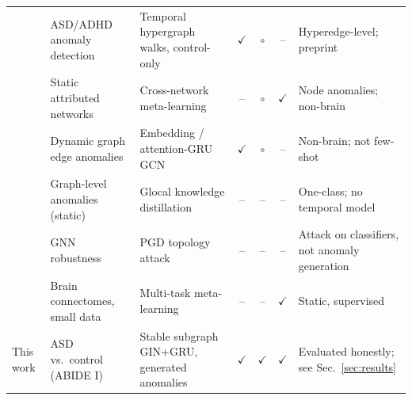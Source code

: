 \documentclass[conference]{IEEEtran}
\newcommand{\ok}{\ensuremath{\checkmark}}
\newcommand{\part}{\ensuremath{\circ}}
\newcommand{\no}{--}
\begin{document}
\begin{table}[!tp]
\begin{tabular}{@{}>{\raggedright\arraybackslash}p{1.0cm}>{\raggedright\arraybackslash}p{3.8cm}>{\raggedright\arraybackslash}p{4.2cm}ccc >{\raggedright\arraybackslash}p{4.2cm}@{}}
\cite{sadeghian2024} & ASD/ADHD anomaly detection & Temporal hypergraph walks, control-only & \ok & \part & \no & Hyperedge-level; preprint \\
\cite{ding2021fewshot} & Static attributed networks & Cross-network meta-learning & \no & \part & \ok & Node anomalies; non-brain \\
\cite{yu2018netwalk,zheng2019addgraph} & Dynamic graph edge anomalies & Embedding / attention-GRU GCN & \ok & \part & \no & Non-brain; not few-shot \\
\cite{ma2022glocal} & Graph-level anomalies (static) & Glocal knowledge distillation & \no & \no & \no & One-class; no temporal model \\
\cite{xu2019topology} & GNN robustness & PGD topology attack & \no & \no & \no & Attack on classifiers, not anomaly generation \\
\cite{yang2022meta} & Brain connectomes, small data & Multi-task meta-learning & \no & \no & \ok & Static, supervised \\
This work & ASD vs.\ control (ABIDE I) & Stable subgraph GIN+GRU, generated anomalies & \ok & \ok & \ok & Evaluated honestly; see Sec.~\ref{sec:results} \\
\bottomrule
\end{tabular}
\end{table}

\end{document}
